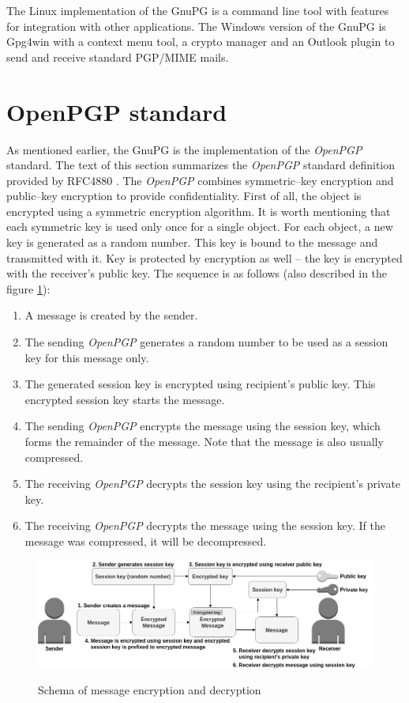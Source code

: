 The Linux implementation of the GnuPG is a command line tool with features for integration with other applications. The Windows version of the GnuPG is Gpg4win with a context menu tool, a crypto manager and an Outlook plugin to send and receive standard PGP/MIME mails.

\section{OpenPGP standard}
As mentioned earlier, the GnuPG is the implementation of the \textit{OpenPGP} standard. The text of this section summarizes the \textit{OpenPGP} standard definition provided by RFC4880 \cite{RFC4880}. The \textit{OpenPGP} combines symmetric--key encryption and public--key encryption to provide confidentiality. First of all, the object is encrypted using a symmetric encryption algorithm. It is worth mentioning that each symmetric key is used only once for a single object. For each object, a new key is generated as a random number. This key is bound to the message and transmitted with it. Key is protected by encryption as well -- the key is encrypted with the receiver's public key. The sequence is as follows (also described in the figure \ref{img:messageEncryption}):
\begin{enumerate}
    \item A message is created by the sender.
    \item The sending \textit{OpenPGP} generates a random number to be used as a session key for this message only.
    \item The generated session key is encrypted using recipient's public key. This encrypted session key starts the message.
    \item The sending \textit{OpenPGP} encrypts the message using the session key, which forms the remainder of the message. Note that the message is also usually compressed.
    \item The receiving \textit{OpenPGP} decrypts the session key using the recipient's private key.
    \item The receiving \textit{OpenPGP} decrypts the message using the session key. If the message was compressed, it will be decompressed.
\end{enumerate}

\begin{figure}[H]
    \begin{center}
        \label{img:messageEncryption}
        \includegraphics[width=1.0\textwidth]{obrazky-figures/messageEncryption.png}
        \caption{Schema of message encryption and decryption}
    \end{center}
\end{figure}

